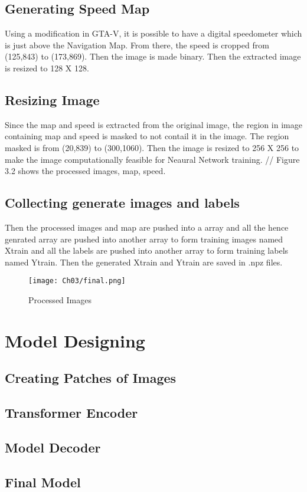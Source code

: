 \subsection{Generating Speed Map}
Using a modification in GTA-V, it is possible to have a digital speedometer which is just above the Navigation Map. From there, the speed is cropped from (125,843) to (173,869). Then the image is made binary. Then the extracted image is resized to 128 X 128.

\subsection{Resizing Image}
Since the map and speed is extracted from the original image, the region in image containing map and speed is masked to not contail it in the image. The region masked is from (20,839) to (300,1060). Then the image is resized to 256 X 256 to make the image computationally feasible for Neaural Network training. 
//
Figure 3.2 shows the processed images, map, speed.

\subsection{Collecting generate images and labels}
Then the processed images and map are pushed into a array and all the hence genrated array are pushed into another array to form training images named Xtrain and all the labels are pushed into another array to form training labels named Ytrain. Then the generated Xtrain and Ytrain are saved in .npz files.

\begin{figure}[h]
    \centering
    \texttt{[image: Ch03/final.png]}
    \caption{Processed Images}
    \label{figure:2}
\end{figure}

\section{Model Designing}

\subsection{Creating Patches of Images}

\subsection{Transformer Encoder}

\subsection{Model Decoder}

\subsection{Final Model}